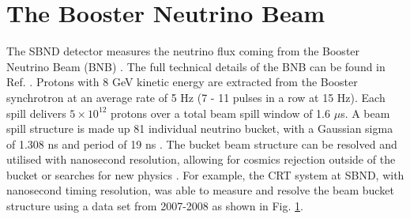 \section{The Booster Neutrino Beam}

The SBND detector measures the neutrino flux coming from the Booster Neutrino Beam (BNB) \cite{}.
The full technical details of the BNB can be found in Ref. \cite{}.
Protons with 8 GeV kinetic energy are extracted from the Booster synchrotron at an average rate of 5 Hz (7 - 11 pulses in a row at 15 Hz).
Each spill delivers $5 \times 10^{12}$ protons over a total beam spill window of 1.6 $\mu$s.
A beam spill structure is made up 81 individual neutrino bucket, with a Gaussian sigma of 1.308 ns and period of 19 ns \cite{}.
The bucket beam structure can be resolved and utilised with nanosecond resolution, allowing for cosmics rejection outside of the bucket or searches for new physics \cite{}.
For example, the CRT system at SBND, with nanosecond timing resolution, was able to measure and resolve the beam bucket structure using a data set from 2007-2008 as shown in Fig. \ref{}.


